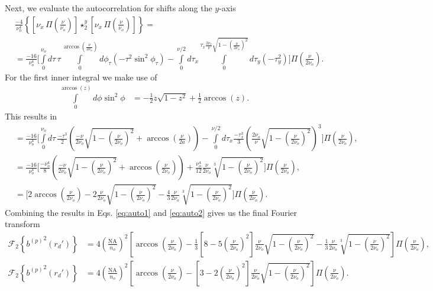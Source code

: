 \documentclass[11pt]{article}
\begin{document}
Next, we evaluate the autocorrelation for shifts along the $y$-axis
\begin{align}
  &\frac{-4}{\nu_0^4}\left\{\left[\nu_x\, \Pi\left(\frac{\nu}{\nu_o}\right)\right] \star_2^y \left[\nu_x\, \Pi\left(\frac{\nu}{\nu_o}\right)\right]\right\} = \\
  &=  \frac{-16}{\nu_o^4}\Bigg[\int\limits_0^{\nu_o} d\tau\, \tau \int\limits_0^{\arccos\left(\frac{\nu}{2\nu_o}\right)}d\phi_{\tau}(-\tau^2\sin^2\phi_{\tau}) - \int\limits_0^{\nu/2}d\tau_x \int\limits_0^{\tau_x \frac{2\nu_o}{\nu}\sqrt{1 - \left(\frac{\nu}{2\nu_o}\right)^2}}d\tau_y(-\tau_y^2)\Bigg]\Pi\left(\frac{\nu}{2\nu_o}\right).
\end{align}
For the first inner integral we make use of
\begin{align}
  \int\limits_0^{\arccos(z)} d\phi \sin^2\phi &= -\frac{1}{2}z\sqrt{1 - z^2} + \frac{1}{2}\arccos(z).
\end{align}
This results in
\begin{align}
  &=\frac{-16}{\nu_o^4}\Bigg[\int\limits_0^{\nu_o} d\tau\, \frac{-\tau^3}{2}\left(\frac{-\nu}{2\nu_o}\sqrt{1 - \left(\frac{\nu}{2\nu_o}\right)^2} + \arccos\left(\frac{\nu}{2a}\right)\right) - \int\limits_0^{\nu/2}d\tau_x \frac{-\tau_x^3}{3}\left(\frac{2 \nu_o}{\nu}\sqrt{1 - \left(\frac{\nu}{2\nu_o}\right)^2}\right)^3\Bigg]\Pi\left(\frac{\nu}{2\nu_o}\right),\\
  &=  \frac{-16}{\nu_o^4}\Bigg[\frac{-\nu_o^4}{8}\left(\frac{-\nu}{2\nu_o}\sqrt{1 - \left(\frac{\nu}{2\nu_o}\right)^2} + \arccos\left(\frac{\nu}{2\nu_o}\right) \right) + \frac{\nu_o^4}{12}\frac{\nu}{2\nu_o}\sqrt[3]{1 - \left(\frac{\nu}{2\nu_o}\right)^2}\Bigg]\Pi\left(\frac{\nu}{2\nu_o}\right),\\
  &=  \Bigg[2\arccos\left(\frac{\nu}{2\nu_o}\right) - 2\frac{\nu}{2\nu_o}\sqrt{1 - \left(\frac{\nu}{2\nu_o}\right)^2} - \frac{4}{3}\frac{\nu}{2\nu_o}\sqrt[3]{1 - \left(\frac{\nu}{2\nu_o}\right)^2}\Bigg]\Pi\left(\frac{\nu}{2\nu_o}\right). \label{eq:auto2}
\end{align}
Combining the results in Eqs. \ref{eq:auto1} and \ref{eq:auto2} gives us the final Fourier transform
\begin{align}
  \mathcal{F}_2\left\{{b^{(p)}}^2(r_d')\right\} &= 4\left(\frac{\text{NA}}{n_o}\right)^2\left[\arccos\left(\frac{\nu}{2\nu_o}\right) - \frac{1}{3}\left[8 - 5\left(\frac{\nu}{2\nu_o}\right)^2\right]\frac{\nu}{2\nu_o} \sqrt{1 - \left(\frac{\nu}{2\nu_o}\right)^2} - \frac{1}{3}\frac{\nu}{2\nu_o}\sqrt[3]{1 - \left(\frac{\nu}{2\nu_o}\right)^2}\right]\Pi\left(\frac{\nu}{2\nu_o}\right),\\
    \mathcal{F}_2\left\{{b^{(p)}}^2(r_d')\right\} &= 4\left(\frac{\text{NA}}{n_o}\right)^2\left[\arccos\left(\frac{\nu}{2\nu_o}\right) - \left[3 - 2\left(\frac{\nu}{2\nu_o}\right)^2\right]\frac{\nu}{2\nu_o} \sqrt{1 - \left(\frac{\nu}{2\nu_o}\right)^2}\right]\Pi\left(\frac{\nu}{2\nu_o}\right).
\end{align}
\end{document}
